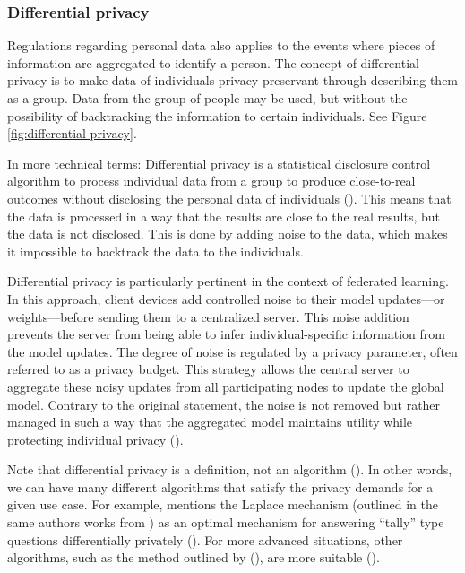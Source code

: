 \subsubsection{Differential privacy}
\label{sec:differential-privacy}
Regulations regarding personal data also applies to the events where pieces of information are aggregated to identify a person. The concept of differential privacy is to make data of individuals privacy-preservant through describing them as a group. Data from the group of people may be used, but without the possibility of backtracking the information to certain individuals. See Figure \ref{fig:differential-privacy}.

In more technical terms: Differential privacy is a statistical disclosure control algorithm to process individual data from a group to produce close-to-real outcomes without disclosing the personal data of individuals (\cite{hu2023metaverse-privacy}). This means that the data is processed in a way that the results are close to the real results, but the data is not disclosed. This is done by adding noise to the data, which makes it impossible to backtrack the data to the individuals.

Differential privacy is particularly pertinent in the context of federated learning. In this approach, client devices add controlled noise to their model updates—or weights—before sending them to a centralized server. This noise addition prevents the server from being able to infer individual-specific information from the model updates. The degree of noise is regulated by a privacy parameter, often referred to as a privacy budget. This strategy allows the central server to aggregate these noisy updates from all participating nodes to update the global model. Contrary to the original statement, the noise is not removed but rather managed in such a way that the aggregated model maintains utility while protecting individual privacy (\cite{sh2023RolwOfWeightTransmissionProtocolinML}).

Note that differential privacy is a definition, not an algorithm (\cite{dw2011DifferentialP}). In other words, we can have many different algorithms that satisfy the privacy demands for a given use case. For example, \citeauthor{dw2011DifferentialP} mentions the Laplace mechanism (outlined in the same authors works from \citeyear{dw2006noise2sensitivity-laplace}) as an optimal mechanism for answering “tally” type questions differentially privately (\citeyear{dw2011DifferentialP}). For more advanced situations, other algorithms, such as the method outlined by \citeauthor{bl2011learning-privacy} (\citeyear{bl2011learning-privacy}), are more suitable (\cite{dw2011DifferentialP}).

